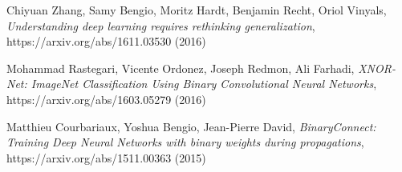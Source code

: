 \documentclass[licencjacka]{pracamgr}
\begin{document}
\begin{thebibliography}{99}

 Chiyuan Zhang, Samy Bengio, Moritz Hardt, Benjamin Recht, Oriol Vinyals, \textit{Understanding deep learning requires rethinking generalization}, https://arxiv.org/abs/1611.03530 (2016)

 Mohammad Rastegari, Vicente Ordonez, Joseph Redmon, Ali Farhadi, \textit{XNOR-Net: ImageNet Classification Using Binary Convolutional Neural Networks}, https://arxiv.org/abs/1603.05279 (2016)

 Matthieu Courbariaux, Yoshua Bengio, Jean-Pierre David, \textit{BinaryConnect: Training Deep Neural Networks with binary weights during propagations}, https://arxiv.org/abs/1511.00363 (2015)

\end{thebibliography}
\end{document}
